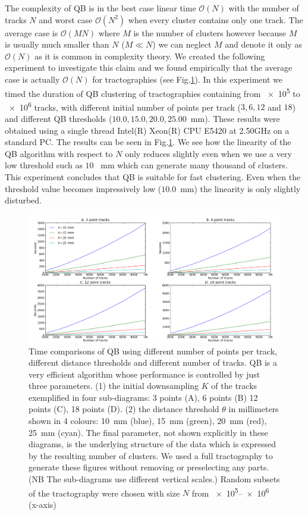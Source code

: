 \documentclass[preprint,authoryear,a4paper,10pt,onecolumn]{elsarticle}
\begin{document}
The complexity of QB is in the best case linear time $\mathcal{O}(N)$
with the number of tracks $N$ and worst case $\mathcal{O}(N^{2})$ when
every cluster contains only one track. The average case is
$\mathcal{O}(MN)$ where $M$ is the number of clusters however because
$M$ is usually much smaller than $N$ ($M\ll N$) we can neglect $M$ and
denote it only as $\mathcal{O}(N)$ as it is common in complexity
theory. We created the following experiment to investigate this claim
and we found empirically that the average case is actually
$\mathcal{O}(N)$ for tractographies (see Fig.\ref{Flo:Speed1}).  In this
experiment we timed the duration of QB clustering of tractographies
containing from \num{e5} to \num{e6} tracks, with different initial
number of points per track ($3,6,12$ and $18$) and different QB
thresholds ($10.0,15.0,20.0,25.00$~mm). These results were obtained using
a single thread Intel(R) Xeon(R) CPU E5420 at 2.50GHz on a standard
PC. The results can be seen in Fig.\ref{Flo:Speed1}. We see how the
linearity of the QB algorithm with respect to $N$ only reduces slightly
even when we use a very low threshold such as $10$ ~mm which can
generate many thousand of clusters. This experiment concludes that QB is
suitable for fast clustering. Even when the threshold value becomes
impressively low ($10.0$~mm) the linearity is only slightly disturbed.

\begin{figure}
\noindent \begin{centering}
\includegraphics[scale=0.33]{Fig_3_2x2+leg-box}
\par\end{centering}
\caption{Time comparisons of QB using different number of points per
  track, different distance thresholds and different number of
  tracks. QB is a very efficient algorithm whose performance is
  controlled by just three parameters. (1) the initial downsampling $K$
  of the tracks exemplified in four sub-diagrams: 3 points (A), 6 points
  (B) 12 points (C), 18 points (D). (2) the distance threshold $\theta$
  in millimeters shown in 4 colours: 10~mm (blue), 15~mm (green), 20~mm
  (red), 25~mm (cyan). The final parameter, not shown explicitly in
  these diagrams, is the underlying structure of the data which is
  expressed by the resulting number of clusters.  We used a full
  tractography to generate these figures without removing or
  preselecting any parts. (NB The sub-diagrams use
  different vertical scales.) Random subsets of the tractography were
  chosen with size $N$ from \numrange{e5}{e6} (x-axis)\label{Flo:Speed1}}
\end{figure}
\end{document}
